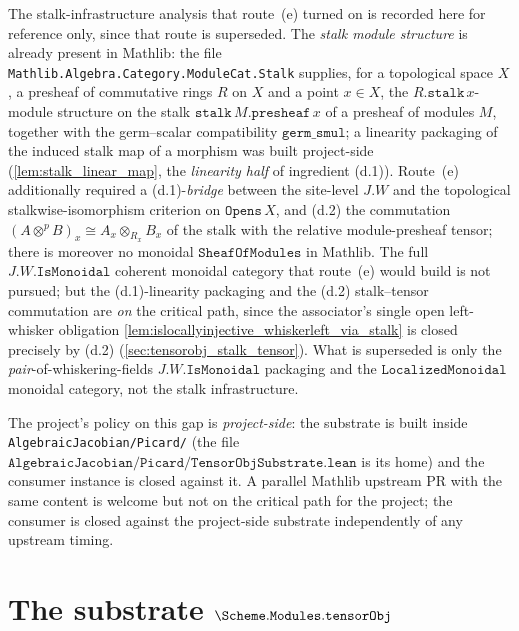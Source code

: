The stalk-infrastructure analysis that route~(e) turned on is recorded here for
reference only, since that route is superseded. The \emph{stalk module structure}
is already present in Mathlib: the file
\texttt{Mathlib.Algebra.Category.ModuleCat.Stalk} supplies, for a topological
space \(X\), a presheaf of commutative rings \(R\) on \(X\) and a point
\(x \in X\), the \(R.\mathtt{stalk}\,x\)-module structure on the stalk
\(\mathtt{stalk}\,M.\mathtt{presheaf}\,x\) of a presheaf of modules \(M\),
together with the germ--scalar compatibility \(\mathtt{germ\_smul}\); a linearity
packaging of the induced stalk map of a morphism was built project-side
(\cref{lem:stalk_linear_map}, the \emph{linearity half} of ingredient (d.1)).
Route~(e) additionally required a (d.1)-\emph{bridge} between the site-level
\(J.W\) and the topological stalkwise-isomorphism criterion on
\(\mathtt{Opens}\,X\), and (d.2) the commutation \((A \otimes^{p} B)_x \cong A_x
\otimes_{R_x} B_x\) of the stalk with the relative module-presheaf tensor; there is
moreover no monoidal \(\mathtt{SheafOfModules}\) in Mathlib. The full \(J.W.\mathtt{IsMonoidal}\) coherent monoidal category that route~(e) would
build is not pursued; but the (d.1)-linearity packaging and the (d.2) stalk--tensor
commutation are \emph{on} the critical path, since the associator's single open
left-whisker obligation \cref{lem:islocallyinjective_whiskerleft_via_stalk} is closed
precisely by (d.2) (\cref{sec:tensorobj_stalk_tensor}). What is superseded is only the
\emph{pair}-of-whiskering-fields \(J.W.\mathtt{IsMonoidal}\) packaging and the
\(\mathtt{LocalizedMonoidal}\) monoidal category, not the stalk infrastructure.

The project's policy on this gap is \emph{project-side}: the substrate is
built inside \texttt{AlgebraicJacobian/Picard/} (the file
\(\texttt{AlgebraicJacobian/Picard/TensorObjSubstrate.lean}\) is its home)
and the consumer instance is closed against it. A parallel Mathlib upstream
PR with the same content is welcome but not on the critical path for the
project; the consumer is closed against the project-side substrate
independently of any upstream timing.

\section{The substrate \(\Scheme.\mathtt{Modules}.\mathtt{tensorObj}\)}
\label{sec:tensorobj_substrate}

